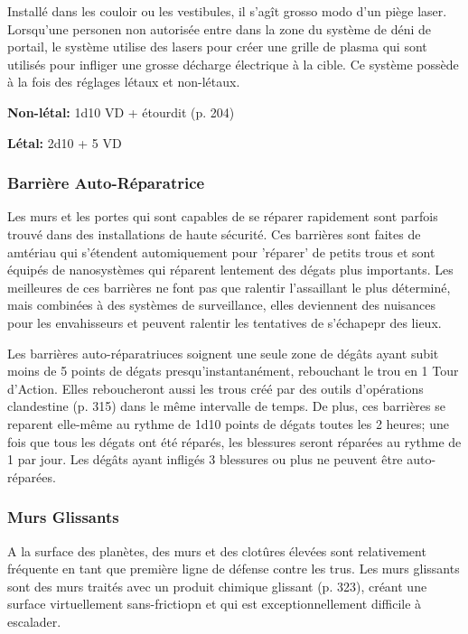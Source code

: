 Installé dans les couloir ou les vestibules, il s'agît grosso modo d'un piège laser. Lorsqu'une personen non autorisée entre dans la zone du système de déni de portail, le système utilise des lasers pour créer une grille de plasma qui sont utilisés pour infliger une grosse décharge électrique à la cible. Ce système possède à la fois des réglages létaux et non-létaux. 

\textbf{Non-létal:} 1d10 VD + étourdit (p. 204) 

\textbf{Létal:} 2d10 + 5 VD 

\subsubsection{Barrière Auto-Réparatrice} 

Les murs et les portes qui sont capables de se réparer rapidement sont parfois trouvé dans des installations de haute sécurité. Ces barrières sont faites de amtériau qui s'étendent automiquement pour 'réparer' de petits trous et sont équipés de nanosystèmes qui réparent lentement des dégats plus importants. Les meilleures de ces barrières ne font pas que ralentir l'assaillant le plus déterminé, mais combinées à des systèmes de surveillance, elles deviennent des nuisances pour les envahisseurs et peuvent ralentir les tentatives de s'échapepr des lieux. 

Les barrières auto-réparatriuces soignent une seule zone de dégâts ayant subit moins de 5 points de dégats presqu'instantanément, rebouchant le trou en 1 Tour d'Action. Elles reboucheront aussi les trous créé par des outils d'opérations clandestine (p. 315) dans le même intervalle de temps. De plus, ces barrières se reparent elle-même au rythme de 1d10 points de dégats toutes les 2 heures; une fois que tous les dégats ont été réparés, les blessures seront réparées au rythme de 1 par jour. Les dégâts ayant infligés 3 blessures ou plus ne peuvent être auto-réparées. 

\subsubsection{Murs Glissants} 

A la surface des planètes, des murs et des clotûres élevées sont relativement fréquente en tant que première ligne de défense contre les trus. Les murs glissants sont des murs traités avec un produit chimique glissant (p. 323), créant une surface virtuellement sans-frictiopn et qui est exceptionnellement difficile à escalader. 

